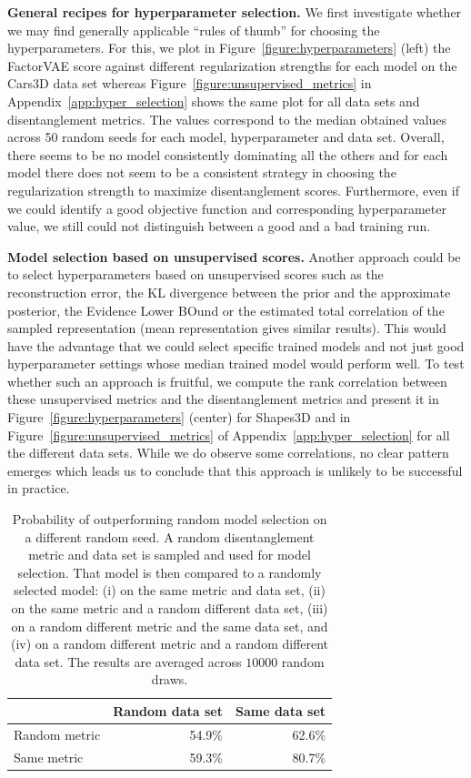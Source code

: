 \documentclass{article}
\begin{document}
\textbf{General recipes for hyperparameter selection.}
We first investigate whether we may find generally applicable ``rules of thumb'' for choosing the hyperparameters.
For this, we plot in Figure~\ref{figure:hyperparameters} (left) the FactorVAE score against different regularization strengths for each model on the Cars3D data set whereas Figure~\ref{figure:unsupervised_metrics} in Appendix~\ref{app:hyper_selection} shows the same plot for all data sets and disentanglement metrics.
The values correspond to the median obtained values across 50 random seeds for each model, hyperparameter and data set.
Overall, there seems to be no model consistently dominating all the others and for each model there does not seem to be a consistent strategy in choosing the regularization strength to maximize disentanglement scores.
Furthermore, even if we could identify a good objective function and corresponding hyperparameter value, we still could not distinguish between a good and a bad training run.

 
\textbf{Model selection based on unsupervised scores.}
Another approach could be to select hyperparameters based on unsupervised scores such as the reconstruction error, the KL divergence between the prior and the approximate posterior, the Evidence Lower BOund or the estimated total correlation of the sampled representation (mean representation gives similar results).
This would have the advantage that we could select specific trained models and not just good hyperparameter settings whose median trained model would perform well.
To test whether such an approach is fruitful, we compute the rank correlation between these unsupervised metrics and the disentanglement metrics and present it in Figure~\ref{figure:hyperparameters} (center) for Shapes3D and in Figure~\ref{figure:unsupervised_metrics} of Appendix~\ref{app:hyper_selection} for all the different data sets.
While we do observe some correlations, no clear pattern emerges which leads us to conclude that this approach is unlikely to be successful in practice.
\begin{table}
\vspace{-2mm}
\caption{Probability of outperforming random model selection on a different random seed. A random disentanglement metric and data set is sampled and used for model selection. That model is then compared to a randomly selected model: (i) on the same metric and data set, (ii) on the same metric and a random different data set, (iii) on a random different metric and the same data set, and (iv) on a random different metric and a random different data set. The results are averaged across $\num{10000}$ random draws.}
\vspace{3mm}
\begin{tabular}{lrr}
\toprule
{} &  Random data set &  Same data set \\
\midrule
Random metric &                      54.9\% &          62.6\% \\
Same metric             &                      59.3\% &          80.7\% \\
\bottomrule
\end{tabular}
    \label{table:random_model}
    \vspace{-3mm}
\end{table}
\end{document}
